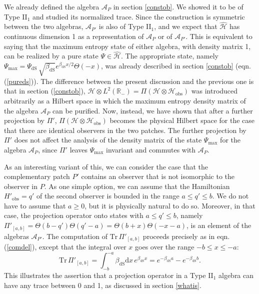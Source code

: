 \documentclass[11pt,a4paper]{article}
\def\be{\begin{equation}}
\def\ee{\end{equation}}
\def\h{\widehat}
\def\A{{\mathcal A}}
\def\d{{\mathrm d}}
\def\R{{\mathbb R}}
\def\h{\widehat}
\def\H{{\mathcal H}}
\def\dS{{\mathrm{dS}}}
\def\obs{{\mathrm{obs}}}
\def\Tr{{\mathrm{Tr}}}
\begin{document}
We already defined the  algebra $\A_P$  in section \ref{constob}. We showed it to be of Type II$_1$ and studied its normalized trace.  Since the construction is symmetric between the
two algebras, $\A_{P'}$ is also of Type II$_1$, and we expect that $\h\H$ has continuous dimension 1
 as a representation of $\A_P$ or of $\A_{P'}$.   This is equivalent to saying that the maximum entropy state
   of either algebra, with density matrix 1, can be realized by a pure state  $\Psi\in \h\H$.   The appropriate state, namely 
   $\Psi_{\mathrm{max}}=\Psi_\dS \,\sqrt{\beta_\dS}e^{\beta_\dS x/2}\Theta(-x)$,
   was already described in section    \ref{constob} (eqn. (\ref{pureds})).  The difference between the present discussion and the previous one is that
   in section (\ref{constob}), $\H\otimes L^2(\R_-)=\Pi(\H\otimes \H_\obs)$ was introduced arbitrarily as a Hilbert space in which the
   maximum entropy density matrix of the algebra $\A_P$ can be purified.   Now, instead, we have shown 
   that after a further projection by $\Pi'$, $\Pi(\H\otimes \H_\obs)$ becomes  the physical
   Hilbert space for the case that there are identical observers in the two patches.   
   The further projection by  $\Pi'$  does not affect the analysis of the density matrix of the state
   $\Psi_{\mathrm{max}}$ for the algebra $\A_P$,  since $\Pi'$ leaves $\Psi_{\mathrm{max}}$
   invariant and commutes with $\A_P$.
   
   As an interesting variant of this, we can consider the case that the complementary patch $P'$ contains an observer that is not isomorphic to the observer in $P$.
   As one simple option, we can assume that the Hamiltonian $H'_\obs=q'$ of the second observer is bounded in the range $a\leq q'\leq b$.   We do not have to 
   assume that $a\geq 0$, but it is physically natural to do so.  Moreover, in that case, the projection operator onto states with $a\leq q'\leq b$, namely 
   $\Pi'_{[a,b]}=\Theta(b-q')\Theta(q'-a)=\Theta(b+x)\Theta(-x-a)$, is an element of the algebras $\A_{P'}$.   The computation of $\Tr\,\Pi'_{[a,b]}$ 
   proceeds precisely as in eqn. (\ref{comdel}),
   except that the integral over $x$ goes over the range $-b\leq x\leq -a$:
   \be\label{newtrace}\Tr\,\Pi'_{[a,b]} =\int_{-b}^{-a}\beta_\dS \d x \,e^{\beta_\dS x} = e^{-\beta_\dS a}-e^{-\beta_\dS b}. \ee
   This illustrates the assertion that a projection operator in a Type II$_1$ algebra can have any trace between 0 and 1, as discussed in section \ref{whatis}.
\end{document}
